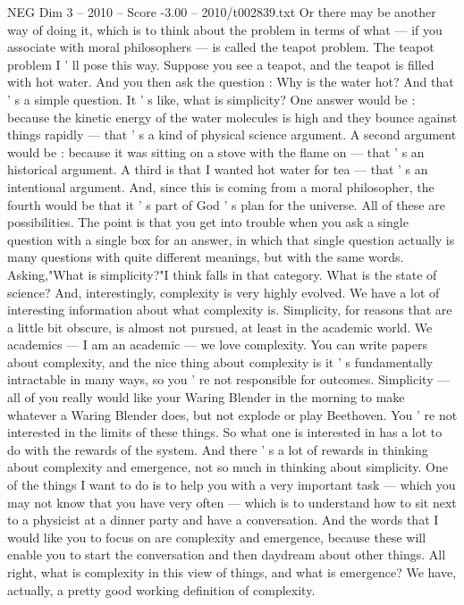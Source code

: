 \begin{textsample}{NEG Dim 3 – 2010 – Score -3.00 – 2010/t002839.txt}
Or there may be another way of doing it, which is to think about the problem in terms of what — if you associate with moral philosophers — is called the teapot problem.
The teapot problem I ' ll pose this way.
Suppose you see a teapot, and the teapot is filled with hot water.
And you then ask the question : Why is the water hot?
And that ' s a simple question.
It ' s like, what is simplicity?
One answer would be : because the kinetic energy of the water molecules is high and they bounce against things rapidly — that ' s a kind of physical science argument.
A second argument would be : because it was sitting on a stove with the flame on — that ' s an historical argument.
A third is that I wanted hot water for tea — that ' s an intentional argument.
And, since this is coming from a moral philosopher, the fourth would be that it ' s part of God ' s plan for the universe.
All of these are possibilities.
The point is that you get into trouble when you ask a single question with a single box for an answer, in which that single question actually is many questions with quite different meanings, but with the same words.
Asking,"What is simplicity?"I think falls in that category.
What is the state of science?
And, interestingly, complexity is very highly evolved.
We have a lot of interesting information about what complexity is.
Simplicity, for reasons that are a little bit obscure, is almost not pursued, at least in the academic world.
We academics — I am an academic — we love complexity.
You can write papers about complexity, and the nice thing about complexity is it ' s fundamentally intractable in many ways, so you ' re not responsible for outcomes.
Simplicity — all of you really would like your Waring Blender in the morning to make whatever a Waring Blender does, but not explode or play Beethoven.
You ' re not interested in the limits of these things.
So what one is interested in has a lot to do with the rewards of the system.
And there ' s a lot of rewards in thinking about complexity and emergence, not so much in thinking about simplicity.
One of the things I want to do is to help you with a very important task — which you may not know that you have very often — which is to understand how to sit next to a physicist at a dinner party and have a conversation.
And the words that I would like you to focus on are complexity and emergence, because these will enable you to start the conversation and then daydream about other things.
All right, what is complexity in this view of things, and what is emergence?
We have, actually, a pretty good working definition of complexity.

\end{textsample}
